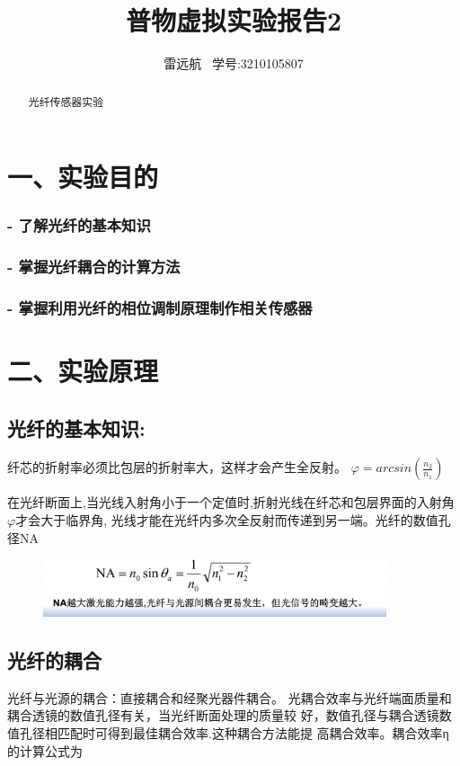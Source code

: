 \documentclass{article}
\title{普物虚拟实验报告2}
\author{雷远航 \ 学号:3210105807}
\begin{document}
\maketitle

\begin{abstract}
    光纤传感器实验
\end{abstract}

\section*{一、实验目的}
\subsubsection*{- 了解光纤的基本知识}
\subsubsection*{- 掌握光纤耦合的计算方法}
\subsubsection*{- 掌握利用光纤的相位调制原理制作相关传感器}



\section*{二、实验原理}

\subsection*{光纤的基本知识:}
纤芯的折射率必须比包层的折射率大，这样才会产生全反射。
$\varphi = arcsin(\frac{n_{2}}{n_{1}})$
    
在光纤断面上,当光线入射角小于一个定值时,折射光线在纤芯和包层界面的入射角$\varphi$才会大于临界角,
光线才能在光纤内多次全反射而传递到另一端。光纤的数值孔径NA
\begin{figure}[H]
    \centering
    \includegraphics[width=0.9\textwidth]{p3.png}
    \end{figure}

\subsection*{光纤的耦合}
光纤与光源的耦合：直接耦合和经聚光器件耦合。
光耦合效率与光纤端面质量和耦合透镜的数值孔径有关，当光纤断面处理的质量较
好，数值孔径与耦合透镜数值孔径相匹配时可得到最佳耦合效率.这种耦合方法能提
高耦合效率。耦合效率η的计算公式为
\end{document}
